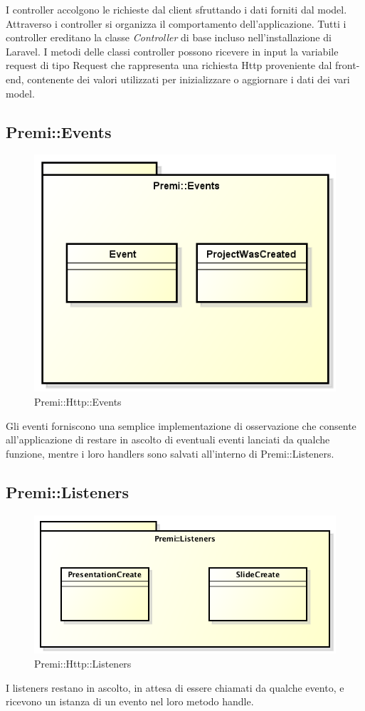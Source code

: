 I controller accolgono le richieste dal client sfruttando i dati forniti dal model. Attraverso i controller si organizza il comportamento dell'applicazione. Tutti i controller ereditano la classe \textit{Controller} di base incluso nell'installazione di \gls{Laravel}. I metodi delle classi controller possono ricevere in input la variabile request di tipo Request che rappresenta una richiesta Http proveniente dal front-end, contenente dei valori utilizzati per inizializzare o aggiornare i dati dei vari model.   


\newpage
\subsection{Premi::Events}
\begin{figure}[h]
	\centering
	\includegraphics[width=0.7\linewidth]{img/premi_back_end_events}
	\caption[Premi::Events]{Premi::Http::Events}
	\label{fig:premi_back_end_events}
\end{figure}
Gli eventi forniscono una semplice implementazione di osservazione che consente all'applicazione di restare in ascolto di eventuali eventi lanciati da qualche funzione, mentre i loro handlers sono salvati all'interno di Premi::Listeners.


\newpage
\subsection{Premi::Listeners}
\begin{figure}[h]
	\centering
	\includegraphics[width=0.7\linewidth]{img/back_end_premi_listeners}
	\caption[Premi::Http::Listeners]{Premi::Http::Listeners}
	\label{fig:back_end_premi_listeners}
\end{figure}

I listeners restano in ascolto, in attesa di essere chiamati da qualche evento, e ricevono un istanza di un evento nel loro metodo handle.

